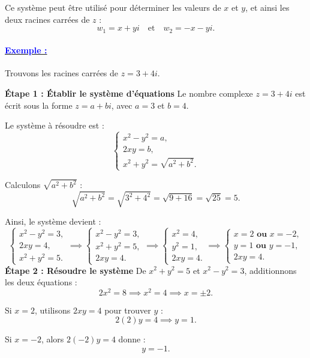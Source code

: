 \documentclass[12pt,a4paper]{article}
\begin{document}
Ce système peut être utilisé pour déterminer les valeurs de \( x \) et \( y \), et ainsi les deux racines carrées de \( z \) :
\[
w_1 = x + yi \quad \text{et} \quad w_2 = -x - yi.
\]

\paragraph{\underline{\textbf{\textcolor{blue}{Exemple :}}}}

Trouvons les racines carrées de \( z = 3 + 4i \).

\textbf{Étape 1 : Établir le système d'équations}  
Le nombre complexe \( z = 3 + 4i \) est écrit sous la forme \( z = a + bi \), avec \( a = 3 \) et \( b = 4 \).  

Le système à résoudre est :
\[
\begin{cases}
x^2 - y^2 = a, \\
2xy = b, \\
x^2 + y^2 = \sqrt{a^2 + b^2}.
\end{cases}
\]

Calculons \( \sqrt{a^2 + b^2} \) :
\[
\sqrt{a^2 + b^2} = \sqrt{3^2 + 4^2} = \sqrt{9 + 16} = \sqrt{25} = 5.
\]

Ainsi, le système devient :
\[
\begin{cases}
x^2 - y^2 = 3, \\
2xy = 4, \\
x^2 + y^2 = 5.
\end{cases}\implies
\begin{cases}
x^2 - y^2 = 3, \\
x^2 + y^2 = 5,\\
2xy = 4.
\end{cases}\implies
\begin{cases}
x^2 = 4, \\
y^2 = 1,\\
2xy = 4.
\end{cases}\implies
\begin{cases}
x = 2 \textbf{ ou } x = -2, \\
y = 1 \textbf{ ou } y = -1,\\
2xy = 4.
\end{cases}
\]
\textbf{Étape 2 : Résoudre le système}  
De \( x^2 + y^2 = 5 \) et \( x^2 - y^2 = 3 \), additionnons les deux équations :
\[
2x^2 = 8 \implies x^2 = 4 \implies x = \pm 2.
\]

Si \( x = 2 \), utilisons \( 2xy = 4 \) pour trouver \( y \) :
\[
2(2)y = 4 \implies y = 1.
\]

Si \( x = -2 \), alors \( 2(-2)y = 4 \) donne :
\[
y = -1.
\]
\end{document}
